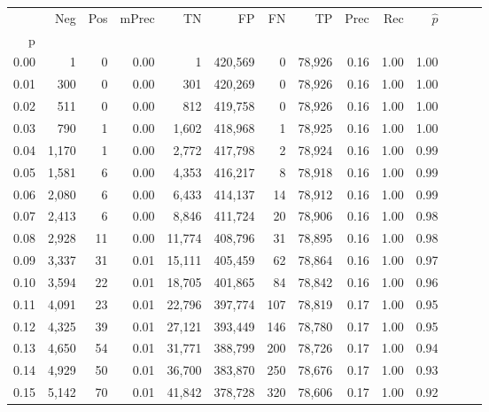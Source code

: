 \begin{tabular}{rrrrrrrrrrrrrr}
\toprule
{} &    Neg &    Pos & mPrec &       TN &       FP &      FN &      TP &  Prec &   Rec & $\hat{p}$ \\
p    &        &        &       &          &          &         &         &       &       &           \\
\midrule
0.00 &      1 &      0 &  0.00 &        1 &  420,569 &       0 &  78,926 &  0.16 &  1.00 &      1.00 \\
0.01 &    300 &      0 &  0.00 &      301 &  420,269 &       0 &  78,926 &  0.16 &  1.00 &      1.00 \\
0.02 &    511 &      0 &  0.00 &      812 &  419,758 &       0 &  78,926 &  0.16 &  1.00 &      1.00 \\
0.03 &    790 &      1 &  0.00 &    1,602 &  418,968 &       1 &  78,925 &  0.16 &  1.00 &      1.00 \\
0.04 &  1,170 &      1 &  0.00 &    2,772 &  417,798 &       2 &  78,924 &  0.16 &  1.00 &      0.99 \\
0.05 &  1,581 &      6 &  0.00 &    4,353 &  416,217 &       8 &  78,918 &  0.16 &  1.00 &      0.99 \\
0.06 &  2,080 &      6 &  0.00 &    6,433 &  414,137 &      14 &  78,912 &  0.16 &  1.00 &      0.99 \\
0.07 &  2,413 &      6 &  0.00 &    8,846 &  411,724 &      20 &  78,906 &  0.16 &  1.00 &      0.98 \\
0.08 &  2,928 &     11 &  0.00 &   11,774 &  408,796 &      31 &  78,895 &  0.16 &  1.00 &      0.98 \\
0.09 &  3,337 &     31 &  0.01 &   15,111 &  405,459 &      62 &  78,864 &  0.16 &  1.00 &      0.97 \\
0.10 &  3,594 &     22 &  0.01 &   18,705 &  401,865 &      84 &  78,842 &  0.16 &  1.00 &      0.96 \\
0.11 &  4,091 &     23 &  0.01 &   22,796 &  397,774 &     107 &  78,819 &  0.17 &  1.00 &      0.95 \\
0.12 &  4,325 &     39 &  0.01 &   27,121 &  393,449 &     146 &  78,780 &  0.17 &  1.00 &      0.95 \\
0.13 &  4,650 &     54 &  0.01 &   31,771 &  388,799 &     200 &  78,726 &  0.17 &  1.00 &      0.94 \\
0.14 &  4,929 &     50 &  0.01 &   36,700 &  383,870 &     250 &  78,676 &  0.17 &  1.00 &      0.93 \\
0.15 &  5,142 &     70 &  0.01 &   41,842 &  378,728 &     320 &  78,606 &  0.17 &  1.00 &      0.92 \\

\end{tabular}
